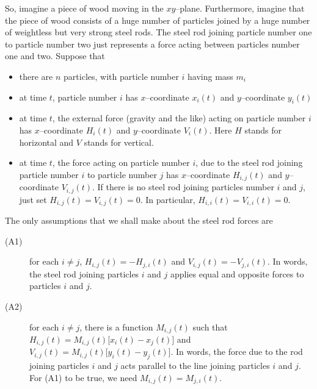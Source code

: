 So, imagine a piece of wood moving in the $xy$--plane.%
Furthermore, imagine that the piece of wood consists of a huge number of
particles joined by a huge number of weightless but very strong steel rods.
The steel rod joining particle number one to particle number two just
represents a force acting between particles number one and two.
Suppose that
\begin{itemize}\itemsep1pt \parskip0pt  %
\item there are $n$ particles, with particle number $i$ having
mass $m_i$
\item at time $t$, particle number $i$ has $x$--coordinate
$x_i(t)$ and $y$--coordinate $y_i(t)$
\item at time $t$,  the external force (gravity and the like)
acting on particle number $i$ has $x$--coordinate
$H_i(t)$ and $y$--coordinate $V_i(t)$. Here $H$ stands for horizontal and
$V$ stands for vertical.
\item at time $t$, the force acting on particle number $i$,
due to the steel rod joining particle number $i$ to particle number $j$
 has $x$--coordinate $H_{i,j}(t)$ and $y$--coordinate $V_{i,j}(t)$. If
there is no steel rod joining particles number $i$ and $j$, just set
$H_{i,j}(t)=V_{i,j}(t)=0$. In particular, $H_{i,i}(t)=V_{i,i}(t)=0$.
\end{itemize}
The only assumptions that we shall make about the steel rod forces
are
\begin{description}
\item[(A1)] for each $i\ne j$, $H_{i,j}(t)=-H_{j,i}(t)$ and
$V_{i,j}(t)=-V_{j,i}(t)$. In words, the steel rod joining particles $i$
and $j$ applies equal and opposite forces to particles $i$ and $j$.
\item[(A2)] for each $i\ne j$, there is a function $M_{i,j}(t)$ such
that $H_{i,j}(t)=M_{i,j}(t)\big[x_i(t)-x_j(t)\big]$ and
$V_{i,j}(t)=M_{i,j}(t)\big[y_i(t)-y_j(t)\big]$. In words, the force due
to the rod joining particles $i$ and $j$ acts parallel to the line
joining particles $i$ and $j$. For (A1) to be true, we need
$M_{i,j}(t)=M_{j,i}(t)$.
\end{description}

